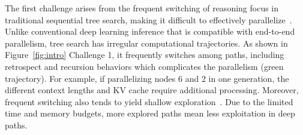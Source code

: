 
The first challenge arises from the frequent switching of reasoning focus in traditional sequential tree search, making it difficult to effectively parallelize~\cite{snell2024scaling}. 
Unlike conventional deep learning inference that is compatible with 
end-to-end parallelism, tree search has irregular computational trajectories. As shown in Figure~\ref{fig:intro} Challenge 1, it frequently switches among paths, including retrospect and recursion behaviors which complicates the parallelism (green trajectory). 
For example, if parallelizing nodes 6 and 2 in one generation, the different context lengths and KV cache require additional processing. 
Moreover, frequent switching 
also tends to yield shallow exploration~\cite{wang2025thoughts}. Due to the limited time and memory budgets, more explored paths mean less exploitation in deep paths. 



